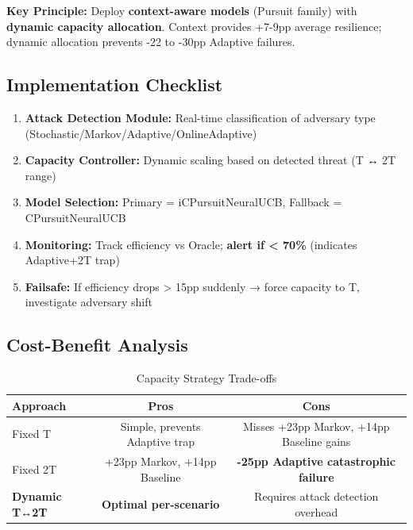 \documentclass[11pt,a4paper]{article}
\newcommand{\critical}[1]{\textcolor{criticalcolor}{\textbf{#1}}}
\newcommand{\success}[1]{\textcolor{successcolor}{\textbf{#1}}}
\begin{document}
\vspace{-0.2cm}

\textbf{Key Principle:} Deploy \success{context-aware models} (Pursuit family) with \success{dynamic capacity allocation}. Context provides +7-9pp average resilience; dynamic allocation prevents -22 to -30pp Adaptive failures.

\subsection{Implementation Checklist}

\vspace{-0.2cm}
\begin{enumerate}
\vspace{-0.2cm}
\item \textbf{Attack Detection Module:} Real-time classification of adversary type (Stochastic/Markov/Adaptive/OnlineAdaptive)
\vspace{-0.2cm}
\item \textbf{Capacity Controller:} Dynamic scaling based on detected threat (T ↔ 2T range)
\vspace{-0.2cm}
\item \textbf{Model Selection:} Primary = iCPursuitNeuralUCB, Fallback = CPursuitNeuralUCB
\vspace{-0.2cm}
\item \textbf{Monitoring:} Track efficiency vs Oracle; \critical{alert if < 70\%} (indicates Adaptive+2T trap)
\vspace{-0.2cm}
\item \textbf{Failsafe:} If efficiency drops > 15pp suddenly → force capacity to T, investigate adversary shift
\end{enumerate}

\subsection{Cost-Benefit Analysis}

\vspace{-0.4cm}

\begin{table}[h]
\scriptsize
\centering
\begin{tabular}{lcc}
\toprule
\textbf{Approach} & \textbf{Pros} & \textbf{Cons} \\
\midrule
Fixed T & Simple, prevents Adaptive trap & Misses +23pp Markov, +14pp Baseline gains \\
Fixed 2T & +23pp Markov, +14pp Baseline & \critical{-25pp Adaptive catastrophic failure} \\
\success{Dynamic T↔2T} & \success{Optimal per-scenario} & Requires attack detection overhead \\
\bottomrule
\end{tabular}
\vspace{-0.2cm}
\caption{Capacity Strategy Trade-offs}
\end{table}
\end{document}

